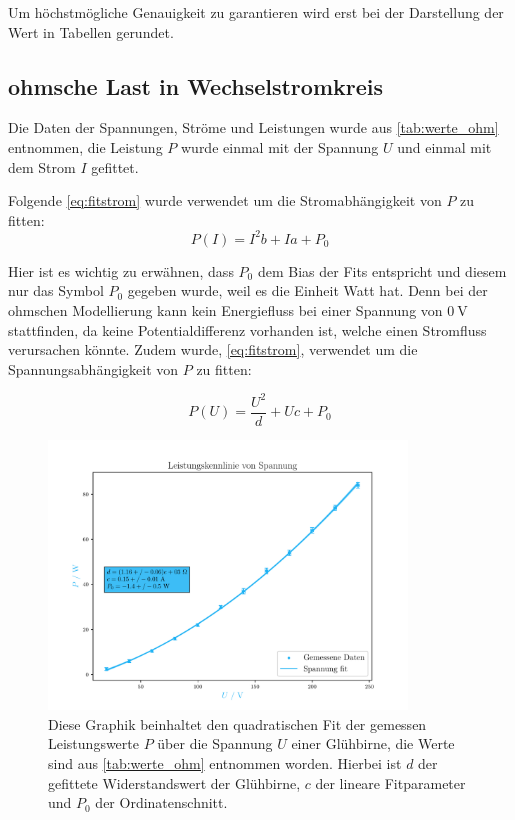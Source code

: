\documentclass[12pt,english,ngerman]{scrartcl}
\begin{document}
Um höchstmögliche Genauigkeit zu garantieren wird erst bei der Darstellung der
Wert in Tabellen gerundet.

\subsection{ohmsche Last in Wechselstromkreis}
Die Daten der Spannungen, Ströme und Leistungen wurde aus
\autoref{tab:werte_ohm} entnommen, die Leistung $P$ wurde einmal mit der
Spannung $U$ und einmal mit dem Strom $I$ gefittet.

Folgende \autoref{eq:fitstrom} wurde verwendet um die Stromabhängigkeit von $P$
zu fitten:
\begin{equation}
	P(I) = I^{2} b + I a + P_0
	\label{eq:fitstrom}
\end{equation}

Hier ist es wichtig zu erwähnen, dass $P_0$ dem Bias der Fits entspricht und
diesem nur das Symbol $P_0$ gegeben wurde, weil es die Einheit Watt hat. Denn
bei der ohmschen Modellierung kann kein Energiefluss bei einer Spannung von
$\SI{0}{\volt}$ stattfinden, da keine Potentialdifferenz vorhanden ist, welche
einen Stromfluss verursachen könnte. Zudem wurde, \autoref{eq:fitstrom},
verwendet um die Spannungsabhängigkeit von $P$ zu fitten:

\begin{equation}
	P(U) = \frac{U^{2}}{d} + U c + P_0
	\label{eq:fitspannung}
\end{equation}

\begin{figure}[H]
	\begin{center}
		\includegraphics[width = 0.85\textwidth]{figures/pUkennlinie.pdf}
	\end{center}
	\caption[Spannungsabhängige Leistungskurve einer Glühbirne]{ Diese Graphik beinhaltet
		den quadratischen Fit der gemessen Leistungswerte $P$ über die Spannung $U$
		einer Glühbirne, die Werte sind aus \autoref{tab:werte_ohm} entnommen worden.
		Hierbei ist $d$ der gefittete Widerstandswert der Glühbirne, $c$ der lineare
		Fitparameter und $P_0$ der Ordinatenschnitt.
	}\label{fig:pUkennlinie}
\end{figure}
\end{document}
